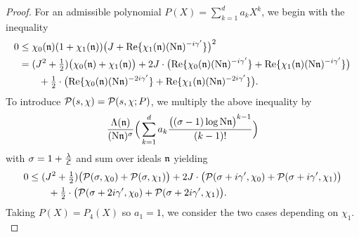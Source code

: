 \documentclass[12pt,psamsfonts]{amsart}
\theoremstyle{definition}
\theoremstyle{remark}
\numberwithin{equation}{section}
\begin{document}
\begin{proof} For an admissible polynomial $P(X) = \sum_{k=1}^d a_k X^k$, we begin with the inequality
\begin{align*}
0 & \leq \chi_0(\mathfrak{n}) (1+\chi_1(\mathfrak{n})) \big( J + \mathrm{Re}\{ \chi_1(\mathfrak{n}) (\mathrm{N}\mathfrak{n})^{-i\gamma'} \} \big)^2 \\
& = (J^2+\tfrac{1}{2})\big( \chi_0(\mathfrak{n}) + \chi_1(\mathfrak{n}) \big) + 2J \cdot \big( \mathrm{Re}\{ \chi_0(\mathfrak{n}) (\mathrm{N}\mathfrak{n})^{-i\gamma'} \} + \mathrm{Re}\{ \chi_1(\mathfrak{n}) (\mathrm{N}\mathfrak{n})^{-i\gamma'} \} \big)  \\
& \qquad + \tfrac{1}{2} \cdot \big( \mathrm{Re}\{ \chi_0(\mathfrak{n}) (\mathrm{N}\mathfrak{n})^{-2i\gamma'} \} + \mathrm{Re}\{ \chi_1(\mathfrak{n}) (\mathrm{N}\mathfrak{n})^{-2i\gamma'} \} \big). 
\end{align*}
To introduce $\mathcal{P}(s,\chi) = \mathcal{P}(s, \chi; P)$, we multiply the above inequality by 
\[
\frac{\Lambda(\mathfrak{n})}{(\mathrm{N}\mathfrak{n})^\sigma} \Big( \sum_{k=1}^d a_k \frac{\big( (\sigma-1) \log \mathrm{N}\mathfrak{n}\big)^{k-1}}{(k-1)!} \Big)
\]
with $\sigma = 1 + \tfrac{\lambda}{\mathcal{L}}$ and sum over ideals $\mathfrak{n}$ yielding
\begin{equation}
\label{SZ-L1Lpmedium-Identity}
\begin{aligned}
0 & \leq (J^2+\tfrac{1}{2})\big( \mathcal{P}(\sigma, \chi_0) + \mathcal{P}(\sigma, \chi_1) \big)   + 2J \cdot \big( \mathcal{P}(\sigma+i\gamma', \chi_0)  +  \mathcal{P}(\sigma+i\gamma', \chi_1)  \big) \\
& \qquad + \tfrac{1}{2} \cdot \big(  \mathcal{P}(\sigma+2i\gamma', \chi_0) +  \mathcal{P}(\sigma+2i\gamma', \chi_1)\big). 
\end{aligned}
\end{equation}
Taking $P(X) = P_4(X)$ so $a_1 = 1$, we consider the two cases depending on $\chi_1$. \\


\end{proof}
\end{document}
